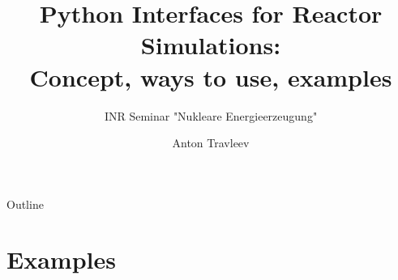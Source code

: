 \documentclass[18pt]{beamer}
\title[PIRS: current possibilites]{Python Interfaces for Reactor Simulations:\\ Concept, ways to use, examples}
\subtitle{INR Seminar "Nukleare Energieerzeugung"}
\author{Anton Travleev}
\institute{Institute for Neutron Physics and Reactor Technology}
\begin{document}

\begin{frame}
\titlepage
\end{frame}

\begin{frame}{Outline}
\tableofcontents
\end{frame}





\section{Examples}








\end{document}
